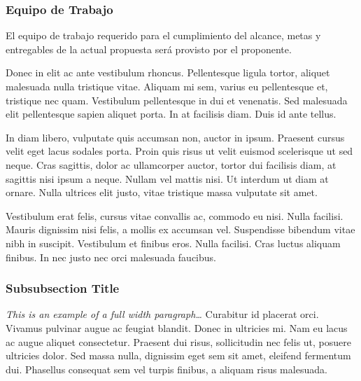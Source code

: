 \documentclass[
	a4paper, %
	12pt, %
]{include/CSSullivanBusinessReport}
\begin{document}
\subsubsection{Equipo de Trabajo}\label{sec:equipo-de-trabajo-1}

El equipo de trabajo requerido para el cumplimiento del alcance, metas y
entregables de la actual propuesta será provisto por el
proponente.

Donec in elit ac ante vestibulum rhoncus. Pellentesque ligula tortor, aliquet malesuada nulla tristique vitae. Aliquam mi sem, varius eu pellentesque et, tristique nec quam. Vestibulum pellentesque in dui et venenatis. Sed malesuada elit pellentesque sapien aliquet porta. In at facilisis diam. Duis id ante tellus. %

In diam libero, vulputate quis accumsan non, auctor in ipsum. Praesent cursus velit eget lacus sodales porta. Proin quis risus ut velit euismod scelerisque ut sed neque. Cras sagittis, dolor ac ullamcorper auctor, tortor dui facilisis diam, at sagittis nisi ipsum a neque. Nullam vel mattis nisi. Ut interdum ut diam at ornare. Nulla ultrices elit justo, vitae tristique massa vulputate sit amet.

\nonumsidenote{
	}Vestibulum erat felis, cursus vitae convallis ac, commodo eu nisi. Nulla facilisi. Mauris dignissim nisi felis, a mollis ex accumsan vel. Suspendisse bibendum vitae nibh in suscipit. Vestibulum et finibus eros. Nulla facilisi. Cras luctus aliquam finibus. In nec justo nec orci malesuada faucibus.

\subsubsection{Subsubsection Title} %

\begin{fullwidth} %
	\textit{This is an example of a full width paragraph\ldots} Curabitur id placerat orci. Vivamus pulvinar augue ac feugiat blandit. Donec in ultricies mi. Nam eu lacus ac augue aliquet consectetur. Praesent dui risus, sollicitudin nec felis ut, posuere ultricies dolor. Sed massa nulla, dignissim eget sem sit amet, eleifend fermentum dui. Phasellus consequat sem vel turpis finibus, a aliquam risus malesuada.
\end{fullwidth}
\end{document}
